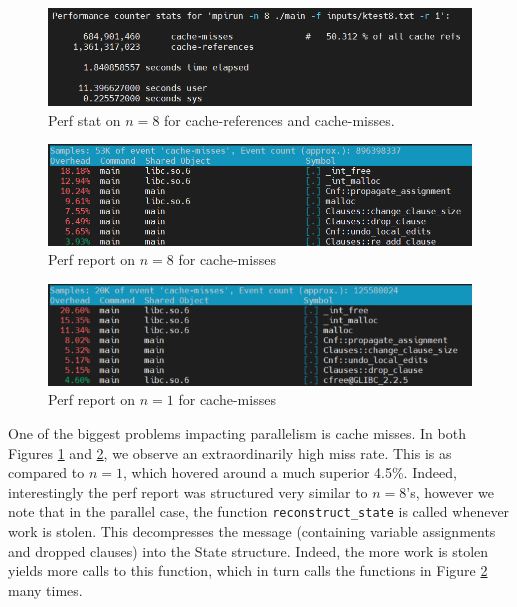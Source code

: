 \documentclass{article}
\begin{document}
\begin{figure}
    \centering
    \includegraphics[width=1\linewidth]{images/perf1.png}
    \caption{Perf stat on $n=8$ for cache-references and cache-misses.}
    \label{fig:perf1}
\end{figure}

\begin{figure}
    \centering
    \includegraphics[width=\linewidth]{images/perf2.png}
    \caption{Perf report on $n=8$ for cache-misses}
    \label{fig:perf2}
\end{figure}

\begin{figure}
    \centering
    \includegraphics[width=1\linewidth]{images/perf_n1.png}
    \caption{Perf report on $n=1$ for cache-misses}
    \label{fig:perf3}
\end{figure}

One of the biggest problems impacting parallelism is cache misses.
In both Figures \ref{fig:perf1} and \ref{fig:perf2}, we observe an extraordinarily high miss rate.
This is as compared to $n=1$, which hovered around a much superior 4.5\%.
Indeed, interestingly the perf report was structured very similar to $n=8$'s, however we note that in the parallel case, the function \verb|reconstruct_state| is called whenever work is stolen.
This decompresses the message (containing variable assignments and dropped clauses) into the State structure.
Indeed, the more work is stolen yields more calls to this function, which in turn calls the functions in Figure \ref{fig:perf2} many times.
\end{document}
